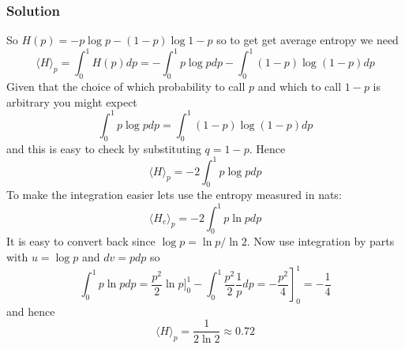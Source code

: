 \documentclass[12pt]{article}
\begin{document}
\subsubsection*{Solution}

So $H(p)=-p\log{p}-(1-p)\log{1-p}$ so to get get average entropy we need
\begin{equation}
\langle H\rangle_p =  \int_0^1 H(p)dp=-\int_0^1 p\log{p}dp -\int_0^1 (1-p)\log{(1-p)}dp
\end{equation}
Given that the choice of which probability to call $p$ and which to call $1-p$ is arbitrary you might expect 
\begin{equation}
  \int_0^1 p\log{p}dp =\int_0^1 (1-p)\log{(1-p)}dp
\end{equation}
and this is easy to check by substituting $q=1-p$. Hence
\begin{equation}
  \langle H\rangle_p =-2\int_0^1 p\log{p}dp
\end{equation}
To make the integration easier lets use the entropy measured in nats:
\begin{equation}
  \langle H_e\rangle_p =-2\int_0^1 p\ln{p}dp
\end{equation}
It is easy to convert back since $\log{p}=\ln{p}/\ln{2}$. Now use integration by parts with $u=\log{p}$ and $dv=pdp$ so
\begin{equation}
  \int_0^1 p\ln{p}dp=\frac{p^2}{2}\ln{p}]_0^1-\int_0^1\frac{p^2}{2}\frac{1}{p}dp=-\left.\frac{p^2}{4}\right]_0^1=-\frac{1}{4}
\end{equation}
and hence
\begin{equation}
  \langle H\rangle_p =\frac{1}{2\ln{2}}\approx 0.72
\end{equation}
\end{document}
